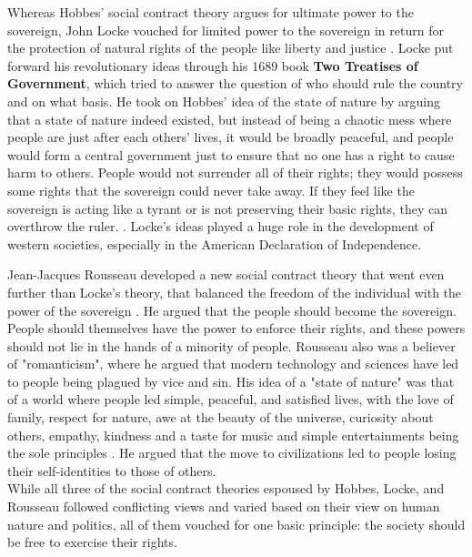 \documentclass[12pt]{article}
\begin{document}
Whereas Hobbes' social contract theory argues for ultimate power to the sovereign, John Locke vouched for limited power to the sovereign in return for the protection of natural rights of the people like liberty and justice \cite{philosophy}. Locke put forward his revolutionary ideas through his 1689 book \textbf{Two Treatises of Government}, which tried to answer the question of who should rule the country and on what basis. He took on Hobbes' idea of the state of nature by arguing that a state of nature indeed existed, but instead of being a chaotic mess where people are just after each others' lives, it would be broadly peaceful, and people would form a central government just to ensure that no one has a right to cause harm to others. People would not surrender all of their rights; they would possess some rights that the sovereign could never take away. If they feel like the sovereign is acting like a tyrant or is not preserving their basic rights, they can overthrow the ruler. \cite[Ch.\ 14]{leviathan} \cite{locke}.
Locke's ideas played a huge role in the development of western societies, especially in the American Declaration of Independence.

Jean-Jacques Rousseau developed a new social contract theory that went even further than Locke's theory, that balanced the freedom of the individual with the power of the sovereign \cite{philosophy}.
He argued that the people should become the sovereign. People should themselves have the power to enforce their rights, and these powers should not lie in the hands of a minority of people. Rousseau also was a believer of "romanticism", where he argued that modern technology and sciences have led to people being plagued by vice and sin. His idea of a "state of nature" was that of a world where people led simple, peaceful, and satisfied lives, with the love of family, respect for nature, awe at the beauty of the universe, curiosity about others, empathy, kindness and a taste for music and simple entertainments being the sole principles \cite{rousseau}. He argued that the move to civilizations led to people losing their self-identities to those of others.
\\

While all three of the social contract theories espoused by Hobbes, Locke, and Rousseau followed conflicting views and varied based on their view on human nature and politics, all of them vouched for one basic principle: the society should be free to exercise their rights.
\\
\end{document}

